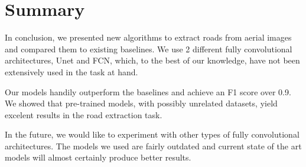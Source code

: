 \section{Summary}
In conclusion, we presented new algorithms to extract roads from aerial images and compared them to existing baselines. We use 2 different fully convolutional architectures, Unet and FCN, which, to the best of our knowledge, have not been extensively used in the task at hand.

Our models handily outperform the baselines and achieve an F1 score over 0.9. We showed that pre-trained models, with possibly unrelated datasets, yield excelent results in the road extraction task.

In the future, we would like to experiment with other types of fully convolutional architectures. The models we used are fairly outdated and current state of the art models will almost certainly produce better results.
